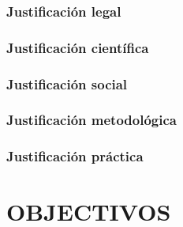 \documentclass[12pt,a4paper]{article}
\begin{document}
\subsubsection{Justificación legal}

\subsubsection{Justificación científica}

\subsubsection{Justificación social}

\subsubsection{Justificación metodológica}

\subsubsection{Justificación práctica}



\section{OBJECTIVOS}
\end{document}
